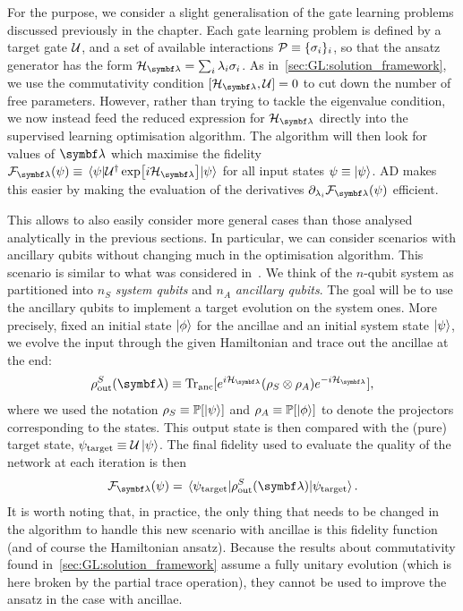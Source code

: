 For the purpose, we consider a slight generalisation of the gate learning problems discussed previously in the chapter. Each gate learning problem is defined by a target gate ${\mathcal{U}}$, and a set of available interactions ${\mathcal{P}}\equiv \{\sigma_i\}_i$, so that the ansatz generator has the form $\calH_\bslambda=\sum_i \lambda_i \sigma_i$. As in~\cref{sec:GL:solution_framework}, we use the commutativity condition $[\calH_\bslambda,\calU]=0$ to cut down the number of free parameters. However, rather than trying to tackle the eigenvalue condition, we now instead feed the reduced expression for $\calH_\bslambda$ directly into the supervised learning optimisation algorithm. The algorithm will then look for values of $\bslambda$ which maximise the fidelity $\calF_\bslambda(\psi)\equiv\mel{\psi}{\calU^\dagger \exp[i\calH_\bslambda]}{\psi}$ for all input states $\psi\equiv\ket\psi$.
AD makes this easier by making the evaluation of the derivatives $\partial_{\lambda_i}\calF_\bslambda(\psi)$ efficient.

This allows to also easily consider more general cases than those analysed analytically in the previous sections. In particular, we can consider scenarios with ancillary qubits without changing much in the optimisation algorithm.
This scenario is similar to what was considered in~\cite{banchi2016quantum}.
We think of the $n$-qubit system as partitioned into $n_S$ \emph{system qubits} and $n_A$ \emph{ancillary qubits}. The goal will be to use the ancillary qubits to implement a target evolution on the system ones. More precisely, fixed an initial state $\ket\phi$ for the ancillae and an initial system state $\ket\psi$, we evolve the input through the given Hamiltonian and trace out the ancillae at the end:
\begin{equation}
    \rho_{\on{out}}^S(\bslambda) \equiv \Tr_{\on{anc}}[e^{i\calH_\bslambda}(\rho_S\otimes\rho_A)e^{-i\calH_\bslambda}],
\end{equation}
where we used the notation $\rho_S\equiv{\mathbb{P}}[\ket\psi]$ and $\rho_A\equiv{\mathbb{P}}[\ket\phi]$ to denote the projectors corresponding to the states. This output state is then compared with the (pure) target state, $\psi_{\operatorname{target}}\equiv{\mathcal{U}}\ket\psi$. The final fidelity used to evaluate the quality of the network at each iteration is then
\begin{equation}
    \calF_\bslambda(\psi) = \mel{\psi_{\on{target}}}{\rho^S_{\on{out}}(\bslambda)}{\psi_{\on{target}}}.
    \label{eq:GL:fidelity_map_vs_unitary}
\end{equation}
It is worth noting that, in practice, the only thing that needs to be changed in the algorithm to handle this new scenario with ancillae is this fidelity function (and of course the Hamiltonian ansatz).
Because the results about commutativity found in~\cref{sec:GL:solution_framework} assume a fully unitary evolution (which is here broken by the partial trace operation), they cannot be used to improve the ansatz in the case with ancillae.

